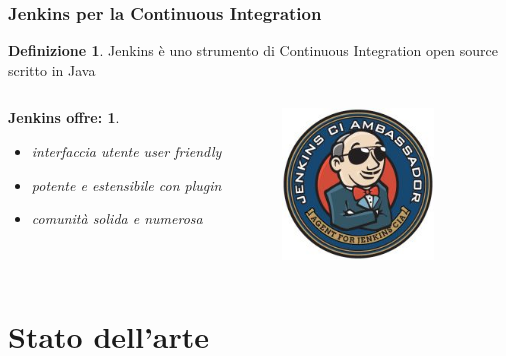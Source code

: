 \documentclass{beamer}
\theoremstyle{definition}
\newtheorem{definizione}{Definizione}
\theoremstyle{plain}
\newtheorem{jenkins}{Jenkins offre:}
\begin{document}
\begin{frame}
\frametitle{Jenkins per la Continuous Integration}
\begin{definizione}
\alert{Jenkins} è uno strumento di Continuous Integration open source scritto in Java
\end{definizione}
\begin{columns}
\begin{jenkins}
\begin{itemize}
\item
interfaccia utente user friendly
\item
potente e estensibile con plugin
\item
comunità solida e numerosa
\end{itemize}
\end{jenkins}
\begin{figure}[!h]
	\begin{center}
\includegraphics[width=4cm, height=4cm]{jenkinsCIA.jpg}
\end{center}
\end{figure}
\end{columns}
\end{frame}

\section{Stato dell'arte}
\end{document}
